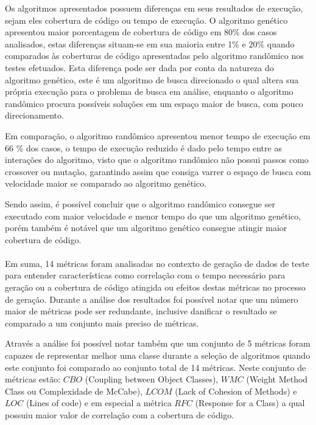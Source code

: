 \documentclass[
	12pt,				%
	oneside,			%
	a4paper,			%
	english,			%
	brazil				%
	]{abntex2ppgsi}
\begin{document}
Os algoritmos apresentados possuem diferenças em seus resultados de execução, sejam eles cobertura de código ou tempo de execução. O algoritmo genético apresentou maior porcentagem de cobertura de código em 80\% dos casos analisados, estas diferenças situam-se em sua maioria entre 1\% e 20\% quando comparados às coberturas de código apresentadas pelo algoritmo randômico nos testes efetuados. Esta diferença pode ser dada por conta da natureza do algoritmo genético, este é um algoritmo de busca direcionado o qual altera sua própria execução para o problema de busca em análise, enquanto o algoritmo randômico procura possíveis soluções em um espaço maior de busca, com pouco direcionamento.

Em comparação, o algoritmo randômico apresentou menor tempo de execução em 66 \% dos casos, o tempo de execução reduzido é dado pelo tempo entre as interações do algoritmo, visto que o algoritmo randômico não possui passos como crossover ou mutação, garantindo assim que consiga varrer o espaço de busca com velocidade maior se comparado ao algoritmo genético.

Sendo assim, é possível concluir que o algoritmo randômico consegue ser executado com maior velocidade e menor tempo do que um algoritmo genético, porém também é notável que um algoritmo genético consegue atingir maior cobertura de código.\\

\\

Em suma, 14 métricas foram analisadas no contexto de geração de dados de teste para entender características como correlação com o tempo necessário para geração ou a cobertura de código atingida ou efeitos destas métricas no processo de geração. Durante a análise dos resultados foi possível notar que um número maior de métricas pode ser redundante, inclusive danificar o resultado se comparado a um conjunto mais preciso de métricas.

Através a análise foi possível notar também que um conjunto de 5 métricas foram capazes de representar melhor uma classe durante a seleção de algoritmos quando este conjunto foi comparado ao conjunto total de 14 métricas. Neste conjunto de métricas estão: $CBO$ (Coupling between Object Classes), $WMC$ (Weight Method Class ou Complexidade de McCabe), $LCOM$ (Lack of Cohesion of Methods) e $LOC$ (Lines of code) e em especial a métrica $RFC$ (Response for a Class) a qual possuiu maior valor de correlação com a cobertura de código.
\end{document}
